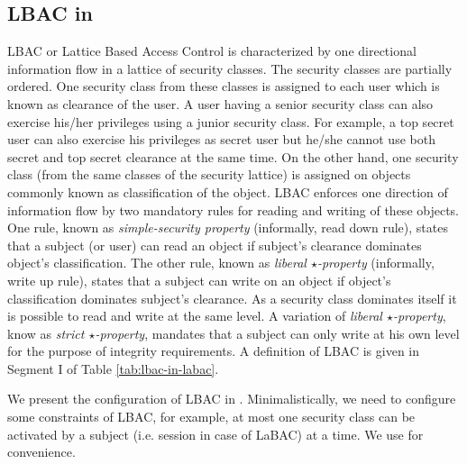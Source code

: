 \newcommand{\latticeHead}{latticeTop} 
\newcommand{\securityClass}{SC}
\newcommand{\liberalStar}{\textit{liberal $\star$-property}}
\newcommand{\strictStar}{\textit{strict $\star$-property}}
\subsection{LBAC in \labacOneOneOne} 




LBAC or Lattice Based Access Control is characterized by one directional information flow in a lattice of security classes. The security classes are partially ordered. One security class from these classes is assigned to each user which is known as clearance of the user. A user having a senior security class can also exercise his/her privileges using a junior  security class. For example, a top secret user can also exercise his privileges as secret user but he/she cannot use both secret and top secret clearance at the same time.  On the other hand, one security class (from the same classes of the security lattice) is assigned on objects commonly known as classification of the object. LBAC enforces one direction of information flow by two mandatory rules for reading and writing of these objects. One rule, known as \textit{simple-security property} (informally, read down rule), states that a subject (or user) can read an object if subject's clearance dominates object's classification. The other rule, known as \textit{liberal $\star$-property} (informally, write up rule),  states that a subject can write on an object if object's classification dominates subject's clearance. As a security class dominates itself it is possible to read and write  at the same level. A variation of \textit{liberal $\star$-property}, know as \textit{strict $\star$-property}, mandates that a subject can only write at his own level for the purpose of integrity requirements. A definition of LBAC is given in Segment I of Table \ref{tab:lbac-in-labac}.




 

We present the configuration of LBAC in  \labacOneOneOne{}. Minimalistically, we need \consLabac{}  to configure some constraints of LBAC, for example, at most one security class can be activated by a subject (i.e. session in case of LaBAC) at a time. We use \labacOneOneOne{} for convenience.  

